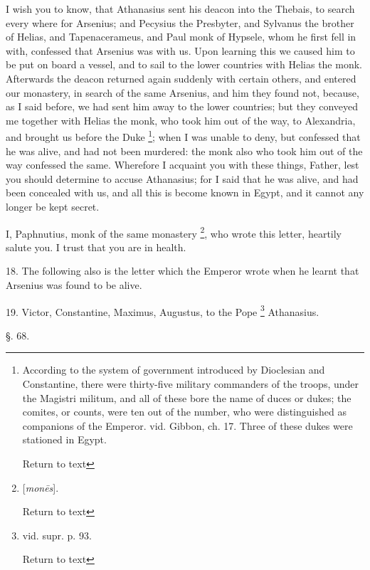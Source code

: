 I wish you to know, that Athanasius sent his
deacon into the Thebais, to search every where for Arsenius; and
Pecysius the Presbyter, and Sylvanus the brother of Helias, and
Tapenacerameus, and Paul monk of Hypsele, whom he first fell in with,
confessed that Arsenius was with us. Upon learning this we caused him
to be put on board a vessel, and to sail to the lower countries with
Helias the monk. Afterwards the deacon returned again suddenly with
certain others, and entered our monastery, in search of the same
Arsenius, and him they found not, because, as I said before, we had
sent him away to the lower countries; but they conveyed me together
with Helias the monk, who took him out of the way, to Alexandria, and
brought us before the Duke \footnote{According to the system of government introduced by Dioclesian and
Constantine, there were thirty-five military commanders of the troops,
under the Magistri militum, and all of these bore the name of duces or
dukes; the comites, or counts, were ten out of the number, who were
distinguished as companions of the Emperor. vid. Gibbon, ch. 17. Three
of these dukes were stationed in Egypt.

Return to text};
when I was unable to deny, but confessed that he was alive, and had
not been murdered: the monk also who took him out of the way confessed
the same. Wherefore I acquaint you with these things, Father, lest you
should determine to accuse Athanasius; for I said that he was alive,
and had been concealed with us, and all this is become known in Egypt,
and it cannot any longer be kept secret.

I, Paphnutius, monk of the same monastery \footnote{[\emph{mon\={e}s}].

Return to text}, who wrote this letter, heartily salute you. I trust that you
are in health.

18. The following also is the letter which the
Emperor wrote when he learnt that Arsenius was found to be alive.

19. Victor, Constantine, Maximus, Augustus, to
the Pope \footnote{vid. supr. p. 93.

Return to text} Athanasius.

§. 68.

